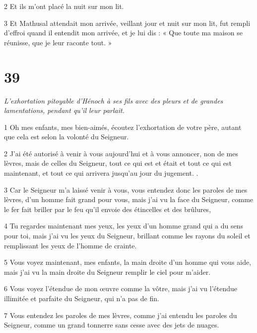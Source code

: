 \par 2 Et ils m'ont placé la nuit sur mon lit.

\par 3 Et Mathusal attendait mon arrivée, veillant jour et nuit sur mon lit, fut rempli d'effroi quand il entendit mon arrivée, et je lui dis : « Que toute ma maison se réunisse, que je leur raconte tout. »

\chapter{39}

\par \textit{L'exhortation pitoyable d'Hénoch à ses fils avec des pleurs et de grandes lamentations, pendant qu'il leur parlait.}

\par 1 Oh mes enfants, mes bien-aimés, écoutez l'exhortation de votre père, autant que cela est selon la volonté du Seigneur.

\par 2 J'ai été autorisé à venir à vous aujourd'hui et à vous annoncer, non de mes lèvres, mais de celles du Seigneur, tout ce qui est et était et tout ce qui est maintenant, et tout ce qui arrivera jusqu'au jour du jugement. .

\par 3 Car le Seigneur m'a laissé venir à vous, vous entendez donc les paroles de mes lèvres, d'un homme fait grand pour vous, mais j'ai vu la face du Seigneur, comme le fer fait briller par le feu qu'il envoie des étincelles et des brûlures,

\par 4 Tu regardes maintenant mes yeux, les yeux d'un homme grand qui a du sens pour toi, mais j'ai vu les yeux du Seigneur, brillant comme les rayons du soleil et remplissant les yeux de l'homme de crainte.

\par 5 Vous voyez maintenant, mes enfants, la main droite d'un homme qui vous aide, mais j'ai vu la main droite du Seigneur remplir le ciel pour m'aider.

\par 6 Vous voyez l'étendue de mon œuvre comme la vôtre, mais j'ai vu l'étendue illimitée et parfaite du Seigneur, qui n'a pas de fin.

\par 7 Vous entendez les paroles de mes lèvres, comme j'ai entendu les paroles du Seigneur, comme un grand tonnerre sans cesse avec des jets de nuages.

